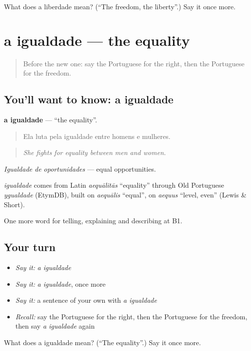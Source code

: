 \begin{tcolorbox}[breakable,colback=teal!4,colframe=teal!35!black,title={Before you move on}]
What does a liberdade mean? (\textquotedblleft{}The freedom, the liberty\textquotedblright{}.) Say it once more.
\end{tcolorbox}
\section[a igualdade]{a igualdade — the equality}

\label{lesson:PT-C363-igualdade}



\begin{quote}
Before the new one: say the Portuguese for the right, then the Portuguese for the freedom.
\end{quote}

\subsection*{You'll want to know: a igualdade}
\textbf{a igualdade} — \textquotedblleft{}the equality\textquotedblright{}.

\begin{quote}
Ela luta pela igualdade entre homens e mulheres.
\end{quote}

\begin{quote}
\emph{She fights for equality between men and women.}
\end{quote}

\emph{Igualdade de oportunidades} — equal opportunities.

\begin{cousinweb}
\emph{igualdade} comes from Latin \emph{aequālitās} \textquotedblleft{}equality\textquotedblright{} through Old Portuguese \emph{ygualdade} (EtymDB), built on \emph{aequālis} \textquotedblleft{}equal\textquotedblright{}, on \emph{aequus} \textquotedblleft{}level, even\textquotedblright{} (Lewis \& Short).
\end{cousinweb}

\begin{grammarlens}[title={What you've built}]
One more word for telling, explaining and describing at B1.
\end{grammarlens}

\subsection*{Your turn}
\begin{itemize}
\raggedright
  \item \emph{Say it:} \emph{a igualdade}
  \item \emph{Say it:} \emph{a igualdade}, once more
  \item \emph{Say it:} a sentence of your own with \emph{a igualdade}
  \item \emph{Recall:} say the Portuguese for the right, then the Portuguese for the freedom, then say \emph{a igualdade} again
\end{itemize}

\begin{tcolorbox}[breakable,colback=teal!4,colframe=teal!35!black,title={Before you move on}]
What does a igualdade mean? (\textquotedblleft{}The equality\textquotedblright{}.) Say it once more.
\end{tcolorbox}
